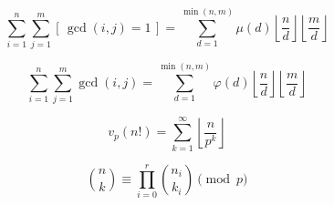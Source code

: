\[
\sum_{i=1}^{n} \sum_{j=1}^{m} [\,\gcd(i,j)=1\,] 
= \sum_{d=1}^{\min(n,m)} \mu(d) \left\lfloor \frac{n}{d} \right\rfloor \left\lfloor \frac{m}{d} \right\rfloor
\]

\[
\sum_{i=1}^{n} \sum_{j=1}^{m} \gcd(i,j) 
= \sum_{d=1}^{\min(n,m)} \varphi(d) \left\lfloor \frac{n}{d} \right\rfloor \left\lfloor \frac{m}{d} \right\rfloor
\]


\[
v_p(n!) = \sum_{k=1}^{\infty} \left\lfloor \frac{n}{p^k} \right\rfloor
\]

\[
\binom{n}{k} \equiv \prod_{i=0}^{r} \binom{n_i}{k_i} \pmod{p}
\]